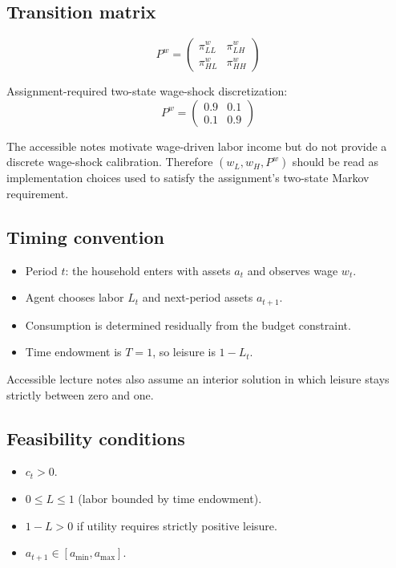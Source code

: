 \documentclass[11pt]{article}
\begin{document}
\subsection{Transition matrix}

\[
P^w = \begin{pmatrix} \pi_{LL}^w & \pi_{LH}^w \\ \pi_{HL}^w & \pi_{HH}^w \end{pmatrix}
\]

Assignment-required two-state wage-shock discretization:
\[
P^w = \begin{pmatrix} 0.9 & 0.1 \\ 0.1 & 0.9 \end{pmatrix}
\]

\begin{notebox}
The accessible notes motivate wage-driven labor income but do not provide a discrete wage-shock calibration. Therefore $(w_L,w_H,P^w)$ should be read as implementation choices used to satisfy the assignment's two-state Markov requirement.
\end{notebox}

\subsection{Timing convention}
\begin{itemize}
    \item Period $t$: the household enters with assets $a_t$ and observes wage $w_t$.
    \item Agent chooses labor $L_t$ and next-period assets $a_{t+1}$.
    \item Consumption is determined residually from the budget constraint.
    \item Time endowment is $T=1$, so leisure is $1-L_t$.
\end{itemize}

\begin{notebox}
Accessible lecture notes also assume an interior solution in which leisure stays strictly between zero and one.
\end{notebox}

\subsection{Feasibility conditions}
\begin{itemize}
    \item $c_t > 0$.
    \item $0 \leq L \leq 1$ (labor bounded by time endowment).
    \item $1 - L > 0$ if utility requires strictly positive leisure.
    \item $a_{t+1} \in [a_{\min}, a_{\max}]$.
\end{itemize}
\end{document}
